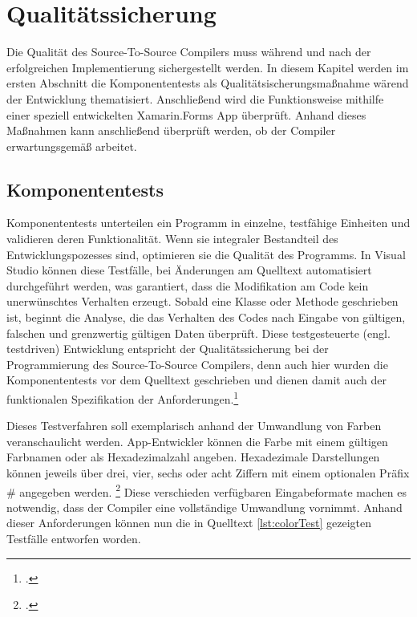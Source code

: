 \chapter{Qualitätssicherung}
\label{chap:Qualitätssicherung}
Die Qualität des Source-To-Source Compilers muss während und nach der erfolgreichen Implementierung sichergestellt werden. In diesem Kapitel werden im ersten Abschnitt die Komponententests als Qualitätsischerungsmaßnahme wärend der Entwicklung thematisiert.  Anschließend wird die Funktionsweise mithilfe einer speziell entwickelten Xamarin.Forms App überprüft.  Anhand dieses Maßnahmen kann anschließend überprüft werden, ob  der Compiler erwartungsgemäß arbeitet. 

\section{Komponententests}
Komponententests unterteilen ein Programm in einzelne,  testfähige Einheiten und validieren deren Funktionalität.  Wenn sie integraler Bestandteil des Entwicklungspozesses sind,  optimieren sie die Qualität des Programms.  In Visual Studio können diese Testfälle, bei Änderungen am Quelltext automatisiert durchgeführt 
werden, was garantiert, dass die Modifikation am Code kein unerwünschtes Verhalten erzeugt.   Sobald eine Klasse oder Methode geschrieben ist, beginnt die Analyse, die das Verhalten des Codes nach Eingabe von gültigen, falschen und grenzwertig gültigen Daten überprüft. 
Diese testgesteuerte (engl. testdriven) Entwicklung entspricht der Qualitätssicherung bei 
der Programmierung des Source-To-Source Compilers, denn auch hier wurden die Komponententests vor dem Quelltext geschrieben und dienen damit auch der funktionalen Spezifikation der Anforderungen.\footcite[Vgl.][Abgerufen am \today]{MicrosoftColor} 

Dieses Testverfahren soll exemplarisch anhand der Umwandlung von Farben veranschaulicht 
werden.
App-Entwickler können die Farbe mit einem gültigen Farbnamen oder als Hexadezimalzahl 
angeben. Hexadezimale Darstellungen können jeweils über drei, vier, sechs oder acht Ziffern mit
einem optionalen Präfix \# angegeben werden.  \footcite[Vgl.][Abgerufen am \today]{MicrosoftColor} 
Diese verschieden verfügbaren Eingabeformate machen es notwendig, dass der Compiler eine 
vollständige Umwandlung vornimmt.  
Anhand dieser Anforderungen können nun die in Quelltext \ref{lst:colorTest} gezeigten Testfälle entworfen worden.



